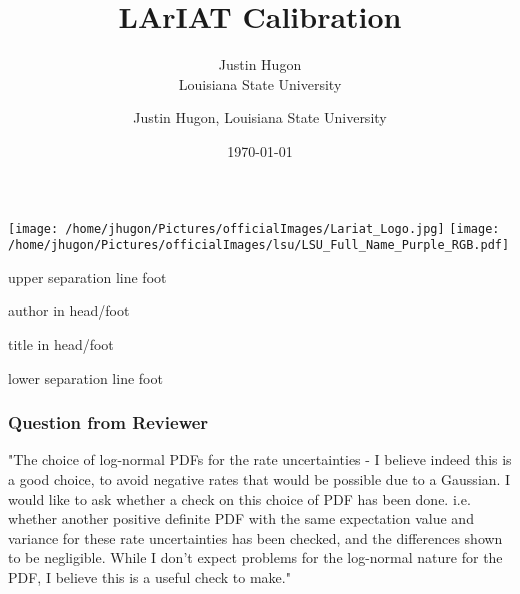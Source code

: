 \documentclass{beamer}
\title{LArIAT Calibration}
\date{\today}
\author{Justin Hugon \\ Louisiana State University}
\begin{document}
\begin{frame}
  \maketitle
\vspace{-1em}
  \texttt{[image: /home/jhugon/Pictures/officialImages/Lariat\_Logo.jpg]}
  \hfill
  \texttt{[image: /home/jhugon/Pictures/officialImages/lsu/LSU\_Full\_Name\_Purple\_RGB.pdf]}
\end{frame}

\makeatletter
{}
{
    \begin{beamercolorbox}[colsep=1.5pt]{upper separation line foot}
    \end{beamercolorbox}
    \begin{beamercolorbox}[ht=2.5ex,dp=1.125ex,%
      leftskip=.3cm,rightskip=.3cm plus1fil]{author in head/foot}%
      \hfill%
      {\insertshortinstitute}%
    \end{beamercolorbox}%
    \begin{beamercolorbox}[ht=2.5ex,dp=1.125ex,%
      leftskip=.3cm,rightskip=.3cm plus1fil]{title in head/foot}%
      {\insertshorttitle \hfill \insertframenumber}%
    \end{beamercolorbox}%
    \begin{beamercolorbox}[colsep=1.5pt]{lower separation line foot}
    \end{beamercolorbox}
}
\makeatother

\author{Justin Hugon, Louisiana State University}


\begin{frame}
\frametitle{Question from Reviewer}
"The choice of log-normal PDFs for the rate uncertainties - I believe
indeed this is a good choice, to avoid negative rates that would be
possible due to a Gaussian. I would like to ask whether a check on this
choice of PDF has been done. i.e. whether another positive definite PDF
with the same expectation value and variance for these rate
uncertainties has been checked, and the differences shown to be
negligible. While I don't expect problems for the log-normal nature for
the PDF, I believe this is a useful check to make."
\end{frame}
\end{document}
